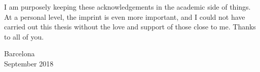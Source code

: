 \documentclass[12pt,a4paper,twoside,fleqn]{memoir}
\begin{document}
I am purposely keeping these acknowledgements in the academic side of things. At a personal level, the imprint is even more important, and I could not have carried out this thesis without the love and support of those close to me. Thanks to all of you.

\begin{flushright}
Barcelona\\
September 2018
\end{flushright}

\cleartoverso %

\end{document}
